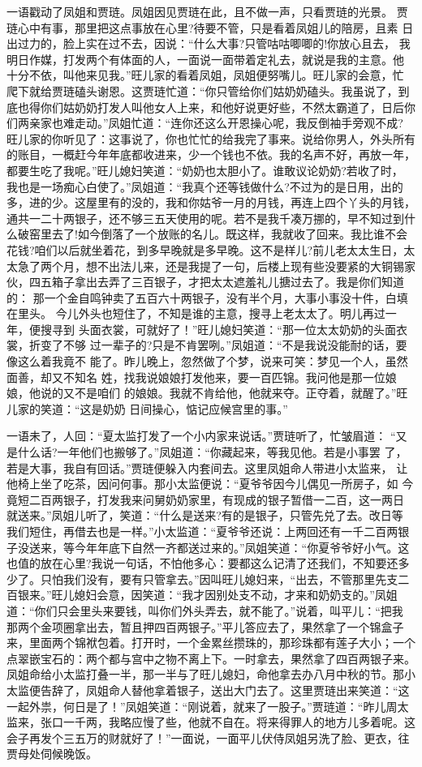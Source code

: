 一语戳动了凤姐和贾琏。凤姐因见贾琏在此，且不做一声，只看贾琏的光景。
贾琏心中有事，那里把这点事放在心里?待要不管，只是看着凤姐儿的陪房，且素
日出过力的，脸上实在过不去，因说：“什么大事?只管咕咕唧唧的!你放心且去，
我明日作媒，打发两个有体面的人，一面说一面带着定礼去，就说是我的主意。他
十分不依，叫他来见我。”旺儿家的看着凤姐，凤姐便努嘴儿。旺儿家的会意，忙
爬下就给贾琏磕头谢恩。这贾琏忙道：“你只管给你们姑奶奶磕头。我虽说了，到
底也得你们姑奶奶打发人叫他女人上来，和他好说更好些，不然太霸道了，日后你
们两亲家也难走动。”凤姐忙道：“连你还这么开恩操心呢，我反倒袖手旁观不成?
旺儿家的你听见了：这事说了，你也忙忙的给我完了事来。说给你男人，外头所有
的账目，一概赶今年年底都收进来，少一个钱也不依。我的名声不好，再放一年，
都要生吃了我呢。”旺儿媳妇笑道：“奶奶也太胆小了。谁敢议论奶奶?若收了时，
我也是一场痴心白使了。”凤姐道：“我真个还等钱做什么?不过为的是日用，出的
多，进的少。这屋里有的没的，我和你姑爷一月的月钱，再连上四个丫头的月钱，
通共一二十两银子，还不够三五天使用的呢。若不是我千凑万挪的，早不知过到什
么破窑里去了!如今倒落了一个放账的名儿。既这样，我就收了回来。我比谁不会
花钱?咱们以后就坐着花，到多早晚就是多早晚。这不是样儿?前儿老太太生日，太
太急了两个月，想不出法儿来，还是我提了一句，后楼上现有些没要紧的大铜锡家
伙，四五箱子拿出去弄了三百银子，才把太太遮羞礼儿搪过去了。我是你们知道的：
那一个金自鸣钟卖了五百六十两银子，没有半个月，大事小事没十件，白填在里头。
今儿外头也短住了，不知是谁的主意，搜寻上老太太了。明儿再过一年，便搜寻到
头面衣裳，可就好了！”旺儿媳妇笑道：“那一位太太奶奶的头面衣裳，折变了不够
过一辈子的?只是不肯罢咧。”凤姐道：“不是我说没能耐的话，要像这么着我竟不
能了。昨儿晚上，忽然做了个梦，说来可笑：梦见一个人，虽然面善，却又不知名
姓，找我说娘娘打发他来，要一百匹锦。我问他是那一位娘娘，他说的又不是咱们
的娘娘。我就不肯给他，他就来夺。正夺着，就醒了。”旺儿家的笑道：“这是奶奶
日间操心，惦记应候宫里的事。”

一语未了，人回：“夏太监打发了一个小内家来说话。”贾琏听了，忙皱眉道：
“又是什么话?一年他们也搬够了。”凤姐道：“你藏起来，等我见他。若是小事罢
了，若是大事，我自有回话。”贾琏便躲入内套间去。这里凤姐命人带进小太监来，
让他椅上坐了吃茶，因问何事。那小太监便说：“夏爷爷因今儿偶见一所房子，如
今竟短二百两银子，打发我来问舅奶奶家里，有现成的银子暂借一二百，这一两日
就送来。”凤姐儿听了，笑道：“什么是送来?有的是银子，只管先兑了去。改日等
我们短住，再借去也是一样。”小太监道：“夏爷爷还说：上两回还有一千二百两银
子没送来，等今年年底下自然一齐都送过来的。”凤姐笑道：“你夏爷爷好小气。这
也值的放在心里?我说一句话，不怕他多心：要都这么记清了还我们，不知要还多
少了。只怕我们没有，要有只管拿去。”因叫旺儿媳妇来，“出去，不管那里先支二
百银来。”旺儿媳妇会意，因笑道：“我才因别处支不动，才来和奶奶支的。”凤姐
道：“你们只会里头来要钱，叫你们外头弄去，就不能了。”说着，叫平儿：“把我
那两个金项圈拿出去，暂且押四百两银子。”平儿答应去了，果然拿了一个锦盒子
来，里面两个锦袱包着。打开时，一个金累丝攒珠的，那珍珠都有莲子大小；一个
点翠嵌宝石的：两个都与宫中之物不离上下。一时拿去，果然拿了四百两银子来。
凤姐命给小太监打叠一半，那一半与了旺儿媳妇，命他拿去办八月中秋的节。那小
太监便告辞了，凤姐命人替他拿着银子，送出大门去了。这里贾琏出来笑道：“这
一起外祟，何日是了！”凤姐笑道：“刚说着，就来了一股子。”贾琏道：“昨儿周太
监来，张口一千两，我略应慢了些，他就不自在。将来得罪人的地方儿多着呢。这
会子再发个三五万的财就好了！”一面说，一面平儿伏侍凤姐另洗了脸、更衣，往
贾母处伺候晚饭。

